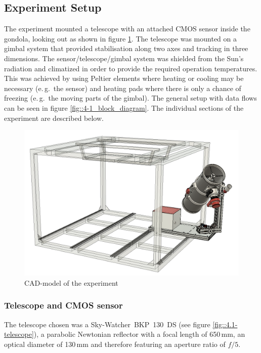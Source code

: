 \subsection{Experiment Setup} \label{Experiment_Setup}




The experiment mounted a telescope with an attached CMOS sensor inside the gondola, looking out as shown in figure \ref{fig::4-1_CAD}. The telescope was mounted on a gimbal system that provided stabilisation along two axes and tracking in three dimensions. The sensor/telescope/gimbal system was shielded from the Sun's radiation and climatized in order to provide the required operation temperatures. This was achieved by using Peltier elements where heating or cooling may be necessary (e.\,g.~the sensor) and heating pads where there is only a chance of freezing (e.\,g.~the moving parts of the gimbal). The general setup with data flows can be seen in figure \ref{fig::4-1_block_diagram}. The individual sections of the experiment are described below.

\begin{figure}[h]
	\centering
	\includegraphics[width=0.7\linewidth]{4-experiment-design/img/mechanical/iso0.png}
	\caption{CAD-model of the experiment}
	\label{fig::4-1_CAD}
\end{figure}


\subsubsection{Telescope and CMOS sensor}
The telescope chosen was a Sky-Watcher~BKP~130~DS (see figure \ref{fig::4.1-telescope}), a parabolic Newtonian reflector with a focal length of 650\,mm, an optical diameter of 130\,mm and therefore featuring an aperture ratio of $f/5$. 

